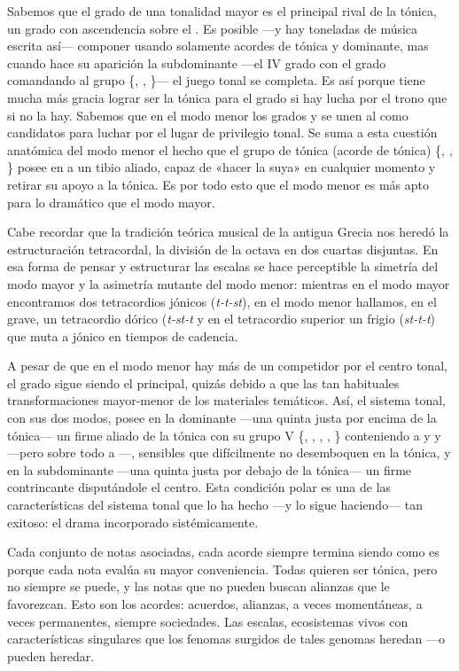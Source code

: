 \documentclass[a4paper,12pt]{article}
\begin{document}
\begin{multicols}{2}
Sabemos que el  grado de una tonalidad mayor es el principal rival de la tónica, un grado con ascendencia sobre el . Es posible ---y hay toneladas de música escrita así--- componer usando solamente acordes de tónica y dominante, mas cuando hace su aparición la subdominante ---el IV grado con el  grado comandando al grupo \{, , \}--- el juego tonal se completa. Es así porque tiene mucha más gracia lograr ser la tónica para el  grado si hay lucha por el trono que si no la hay. Sabemos que en el modo menor los grados  y  se unen al  como candidatos para luchar por el lugar de privilegio tonal. Se suma a esta cuestión anatómica del modo menor el hecho que el grupo de tónica (acorde de tónica) \{, , \} posee en  a un tibio aliado, capaz de «hacer la suya» en cualquier momento y retirar su apoyo a la tónica. Es por todo esto que el modo menor es más apto para lo dramático que el modo mayor.

Cabe recordar que la tradición teórica musical de la antigua Grecia nos heredó la estructuración tetracordal, la división de la octava en dos cuartas disjuntas. En esa forma de pensar y estructurar las escalas se hace perceptible la simetría del modo mayor y la asimetría mutante del modo menor: mientras en el modo mayor encontramos dos tetracordios jónicos (\emph{t-t-st}), en el modo menor hallamos, en el grave, un tetracordio dórico (\emph{t-st-t} y en el tetracordio superior un frigio (\emph{st-t-t}) que muta a jónico en tiempos de cadencia.

A pesar de que en el modo menor hay más de un competidor por el centro tonal, el  grado sigue siendo el principal, quizás debido a que las tan habituales transformaciones mayor-menor de los materiales temáticos. Así, el sistema tonal, con sus dos modos, posee en la dominante ---una quinta justa por encima de la tónica--- un firme aliado de la tónica con su grupo V \{, , , , \} conteniendo a  y  y  ---pero sobre todo a ---, sensibles que difícilmente no desemboquen en la tónica, y en la subdominante ---una quinta justa por debajo de la tónica--- un firme contrincante disputándole el centro. Esta condición polar es una de las características del sistema tonal que lo ha hecho ---y lo sigue haciendo--- tan exitoso: el drama incorporado sistémicamente.

Cada conjunto de notas asociadas, cada acorde siempre termina siendo como es porque cada nota evalúa su mayor conveniencia. Todas quieren ser tónica, pero no siempre se puede, y las notas que no pueden buscan alianzas que le favorezcan. Esto son los acordes: acuerdos, alianzas, a veces momentáneas, a veces permanentes, siempre sociedades. Las escalas, ecosistemas vivos con características singulares que los fenomas surgidos de tales genomas heredan ---o pueden heredar.


\end{multicols}
\end{document}
